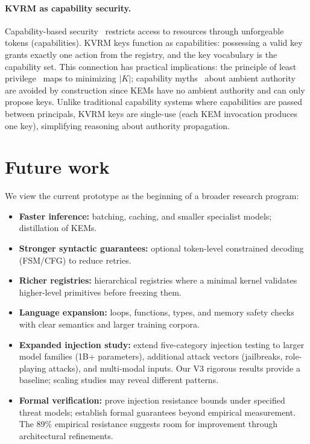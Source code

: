 \documentclass[11pt]{article}
\begin{document}
\paragraph{KVRM as capability security.}
Capability-based security~\cite{dennis1966cap,levy1984cap} restricts access to resources through unforgeable tokens (capabilities).
KVRM keys function as capabilities: possessing a valid key grants exactly one action from the registry, and the key vocabulary is the capability set.
This connection has practical implications: the principle of least privilege~\cite{saltzer1975least} maps to minimizing $|K|$; capability myths~\cite{miller2003capmyths} about ambient authority are avoided by construction since KEMs have no ambient authority and can only propose keys.
Unlike traditional capability systems where capabilities are passed between principals, KVRM keys are single-use (each KEM invocation produces one key), simplifying reasoning about authority propagation.

\section{Future work}
We view the current prototype as the beginning of a broader research program:
\begin{itemize}[leftmargin=*]
  \item \textbf{Faster inference:} batching, caching, and smaller specialist models; distillation of KEMs.
  \item \textbf{Stronger syntactic guarantees:} optional token-level constrained decoding (FSM/CFG) to reduce retries.
  \item \textbf{Richer registries:} hierarchical registries where a minimal kernel validates higher-level primitives before freezing them.
  \item \textbf{Language expansion:} loops, functions, types, and memory safety checks with clear semantics and larger training corpora.
  \item \textbf{Expanded injection study:} extend five-category injection testing to larger model families (1B+ parameters), additional attack vectors (jailbreaks, role-playing attacks), and multi-modal inputs. Our V3 rigorous results provide a baseline; scaling studies may reveal different patterns.
  \item \textbf{Formal verification:} prove injection resistance bounds under specified threat models; establish formal guarantees beyond empirical measurement. The 89\% empirical resistance suggests room for improvement through architectural refinements.
\end{itemize}
\end{document}
